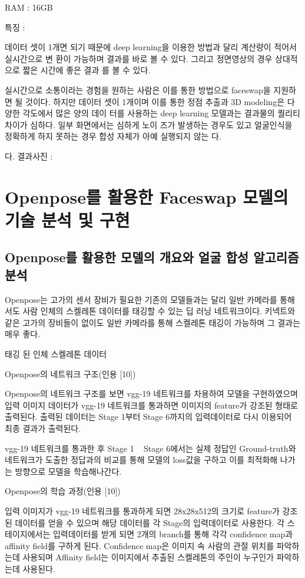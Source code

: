 \documentclass{oblivoir}
\begin{document}
 RAM : 16GB

특징 :

 데이터 셋이 1개면 되기 때문에 deep learning을 이용한 방법과 달리 계산량이 적어서 실시간으로 변 환이 가능하며 결과를 바로 볼 수 있다. 그리고 정면영상의 경우 상대적으로 짧은 시간에 좋은 결과 를 볼 수 있다.

 실시간으로 소통이라는 경험을 원하는 사람은 이를 통한 방법으로 faceswap을 지원하면 될 것이다.  하지만 데이터 셋이 1개이며 이를 통한 정점 추출과 3D modeling은 다양한 각도에서 많은 양의 데이 터를 사용하는 deep learning 모델과는 결과물의 퀄리티 차이가 심하다. 일부 화면에서는 심하게 노이 즈가 발생하는 경우도 있고 얼굴인식을 정확하게 하지 못하는 경우 합성 자체가 아예 실행되지 않는 다.

    다. 결과사진 :

\chapter{Openpose를 활용한 Faceswap 모델의 기술 분석 및 구현}

      \section{Openpose를 활용한 모델의 개요와 얼굴 합성 알고리즘 분석}

Openpose는 고가의 센서 장비가 필요한 기존의 모델들과는 달리 일반 카메라를 통해서도 사람 인체의 스켈레톤 데이터를 태깅할 수 있는 딥 러닝 네트워크이다. 키넥트와 같은 고가의 장비들이 없이도 일반 카메라를 통해 스켈레톤 태깅이 가능하며 그 결과는 매우 좋다.

태깅 된 인체 스켈레톤 데이터

Openpose의 네트워크 구조(인용 [10])

Openpose의 네트워크 구조를 보면 vgg-19 네트워크를 차용하여 모델을 구현하였으며 입력 이미지 데이터가 vgg-19 네트워크를 통과하면 이미지의 feature가 강조된 형태로 출력된다. 출력된 데이터는 Stage 1부터 Stage 6까지의 입력데이터로 다시 이용되어 최종 결과가 출력된다.

vgg-19 네트워크를 통과한 후 Stage 1 ~ Stage 6에서는 실제 정답인 Ground-truth와 네트워크가 도출한 정답과의 비교를 통해 모델의 loss값을 구하고 이를 최적화해 나가는 방향으로 모델을 학습해나간다.

Openpose의 학습 과정(인용 [10])

입력 이미지가 vgg-19 네트워크를 통과하게 되면 28x28x512의 크기로 feature가 강조된 데이터를 얻을 수 있으며 해당 데이터를 각 Stage의 입력데이터로 사용한다. 각 스테이지에서는 입력데이터를 받게 되면 2개의 branch를 통해 각각 confidence map과 affinity field를 구하게 된다. Confidence map은 이미지 속 사람의 관절 위치를 파악하는데 사용되며 Affinity field는 이미지에서 추출된 스켈레톤의 주인이 누구인가 파악하는데 사용된다.
\end{document}
